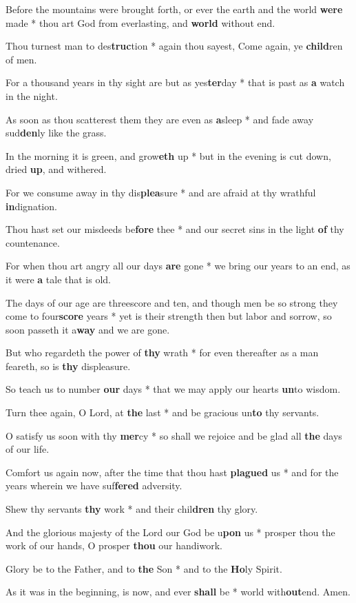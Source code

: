 \begin{multicols}{2}
	Before the mountains were brought forth, or ever the earth and the world \textbf{were} made * thou art God from everlasting, and \textbf{world} without end.
	
	Thou turnest man to des\textbf{truc}tion * again thou sayest, Come again, ye \textbf{child}ren of men.
	
	For a thousand years in thy sight are but as yes\textbf{ter}day * that is past as \textbf{a} watch in the night.
	
	As soon as thou scatterest them they are even as \textbf{a}sleep * and fade away sud\textbf{den}ly like the grass.
	
	In the morning it is green, and grow\textbf{eth} up * but in the evening is cut down, dried \textbf{up}, and withered.
	
	For we consume away in thy dis\textbf{plea}sure * and are afraid at thy wrathful \textbf{in}dignation.
	
	Thou hast set our misdeeds be\textbf{fore} thee * and our secret sins in the light \textbf{of} thy countenance.
	
	For when thou art angry all our days \textbf{are} gone * we bring our years to an end, as it were \textbf{a} tale that is old.
	
	The days of our age are threescore and ten, and though men be so strong they come to four\textbf{score} years * yet  is their strength then but labor and sorrow, so soon passeth it a\textbf{way} and we are gone.
	
	But who regardeth the power of \textbf{thy} wrath * for even thereafter as a man feareth, so is \textbf{thy} displeasure.
	
	So teach us to number \textbf{our} days * that we may apply our hearts \textbf{un}to wisdom.
	
	Turn thee again, O Lord, at \textbf{the} last * and be gracious un\textbf{to} thy servants.
	
	O satisfy us soon with thy \textbf{mer}cy * so shall we rejoice and be glad all \textbf{the} days of our life.
	
	Comfort us again now, after the time that thou hast \textbf{plagued} us * and for the years wherein we have suf\textbf{fered} adversity.
	
	Shew thy servants \textbf{thy} work * and their chil\textbf{dren} thy glory.
	
	And the glorious majesty of the Lord our God be u\textbf{pon} us * prosper thou the work of our hands, O prosper \textbf{thou} our handiwork.
	
	Glory be to the Father, and to \textbf{the} Son * and to the \textbf{Ho}ly Spirit.
	
	As it was in the beginning, is now, and ever \textbf{shall} be * world with\textbf{out}end. Amen.
\end{multicols}